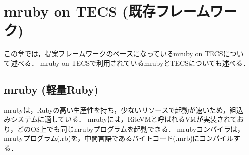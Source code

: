 \documentclass[submit,techrep]{ipsj}
\begin{document}
\vspace{-2mm}
\section{mruby on TECS (既存フレームワーク)}
\vspace{-2mm}
\label{sec:Background}
%
この章では，提案フレームワークのベースになっているmruby on TECSについて述べる．
mruby on TECSで利用されているmrubyとTECSについても述べる．
\vspace{-5mm}
\subsection{mruby (軽量Ruby)}

mrubyは，Rubyの高い生産性を持ち，少ないリソースで起動が速いため，組込みシステムに適している．
mrubyには，RiteVMと呼ばれるVMが実装されており，どのOS上でも同じmrubyプログラムを起動できる．
mrubyコンパイラは，mrubyプログラム(.rb)を，中間言語であるバイトコード(.mrb)にコンパイルする．

\vspace{-5mm}
\end{document}
